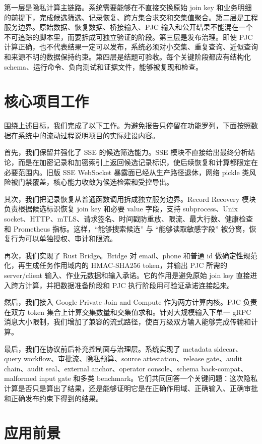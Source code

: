 \documentclass[UTF8,a4paper,12pt,oneside]{ctexrep}
\begin{document}
第一层是隐私计算主链路。系统需要能够在不直接交换原始 join key 和业务明细的前提下，完成候选筛选、记录恢复、跨方集合求交和交集值聚合。第二层是工程服务边界。原始数据、恢复数据、桥接输入、PJC 输入和公开结果不能混在一个不可追踪的脚本里，而要拆成可独立验证的阶段。第三层是发布治理。即使 PJC 计算正确，也不代表结果一定可以发布，系统必须对小交集、重复查询、近似查询和来源不明的数据保持约束。第四层是结题可验收。每个关键阶段都应有结构化 schema、运行命令、负向测试和证据文件，能够被复现和检查。

\section{核心项目工作}

围绕上述目标，我们完成了以下工作。为避免报告只停留在功能罗列，下面按照数据在系统中的流动过程说明项目的实际建设内容。

首先，我们保留并强化了 SSE 的候选筛选能力。SSE 模块不直接给出最终分析结论，而是在加密记录和加密索引上返回候选记录标识，使后续恢复和计算都限定在必要范围内。旧版 SSE WebSocket 暴露面已经从生产路径退休，网络 pickle 类风险被门禁覆盖，核心能力收敛为候选检索和受控导出。

其次，我们把记录恢复从普通函数调用拆成独立服务边界。Record Recovery 模块负责根据候选标识恢复 join key 和必要 value 字段，支持 subprocess、Unix socket、HTTP、mTLS、请求签名、时间戳防重放、限流、最大行数、健康检查和 Prometheus 指标。这样，``能够搜索候选'' 与 ``能够读取敏感字段'' 被分离，恢复行为可以单独授权、审计和限流。

再次，我们实现了 Rust Bridge。Bridge 对 email、phone 和普通 id 做确定性规范化，再生成任务作用域内的 HMAC-SHA256 token，并输出 PJC 所需的 server/client 输入、作业元数据和输入承诺。它的作用是避免原始 join key 直接进入跨方计算，并把数据准备阶段和 PJC 执行阶段用可验证承诺连接起来。

然后，我们接入 Google Private Join and Compute 作为两方计算内核。PJC 负责在双方 token 集合上计算交集数量和交集值求和。针对大规模输入下单一 gRPC 消息大小限制，我们增加了兼容的流式路径，使百万级双方输入能够完成传输和计算。

最后，我们在协议前后补充控制面与治理层。系统实现了 metadata sidecar、query workflow、审批流、隐私预算、source attestation、release gate、audit chain、audit seal、external anchor、operator console、schema back-compat、malformed input gate 和多类 benchmark。它们共同回答一个关键问题：这次隐私计算是否只是算出了结果，还是能够证明它是在正确作用域、正确输入、正确审批和正确发布约束下得到的结果。

\section{应用前景}
\end{document}
